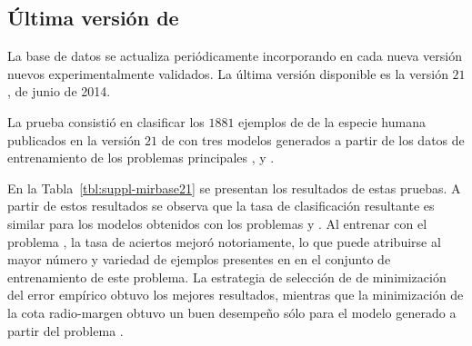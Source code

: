 %
%
\subsection{Última versión de \mirbase}
%
La base de datos \work\mirbase{} se actualiza periódicamente
incorporando en cada nueva versión nuevos 
experimentalmente validados.
La última versión disponible es la versión $21$, de junio de 2014.

La prueba consistió en clasificar los $1881$ ejemplos de 
de la especie humana publicados en la versión $21$ de \work\mirbase{}
con tres modelos generados a partir de los datos de entrenamiento de
los problemas principales \prob\tripletsvm{}, \prob\mipred{} y
\prob\micropred{}.

En la Tabla~\ref{tbl:suppl-mirbase21} se presentan los resultados
de estas pruebas.
A partir de estos resultados se observa que la tasa de clasificación
resultante es similar para los modelos obtenidos con los problemas
\prob\tripletsvm{} y \prob\mipred{}.
Al entrenar con el problema \prob\micropred{}, la tasa de aciertos
mejoró notoriamente, lo que puede atribuirse al mayor número y
variedad de ejemplos presentes en en el conjunto de entrenamiento de
este problema.
La estrategia de selección de  de minimización del error
empírico obtuvo los mejores resultados, mientras que la minimización
de la cota radio-margen obtuvo un buen desempeño sólo para el modelo
generado a partir del problema \prob\micropred{}.

